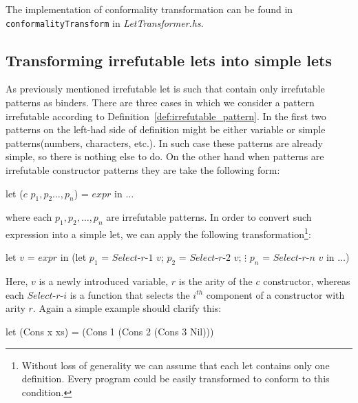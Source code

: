 \documentclass[12pt,a4paper]{report}
\begin{document}
The implementation of conformality transformation can be found in
\texttt{conformalityTransform} in \textit{LetTransformer.hs}.

\subsection{Transforming irrefutable lets into simple lets}
As previously mentioned irrefutable let is such that contain only
irrefutable patterns as binders. There are three cases in which we consider a
pattern irrefutable according to Definition~\ref{def:irrefutable_pattern}. In
the first two patterns on the left-had side of definition might be either
variable or simple patterns(numbers, characters, etc.). In such case these
patterns are already simple, so there is nothing else to do. On the other hand
when patterns are irrefutable constructor patterns they are take the following
form:

\vspace*{0.2in}
\begin{code}[style=haskell,mathescape=true]
  let ($c$ $p_1, p_2 \ldots, p_n$) = $expr$ in $\ldots$
\end{code}

where each $p_1, p_2, \ldots, p_n$ are irrefutable patterns. In order to
convert such expression into a simple let, we can apply the following
transformation\footnote{Without loss of generality we can assume that each
let contains only one definition. Every program could be easily
transformed to conform to this condition.}:

\vspace*{0.2in}
\begin{code}[style=haskell,mathescape=true]
let $v$ = $expr$
in (let $p_1$ = $Select\mbox{-}r\mbox{-}1$ $v$;
        $p_2$ = $Select\mbox{-}r\mbox{-}2$ $v$;
              $\vdots$
        $p_n$ = $Select\mbox{-}r\mbox{-}n$ $v$
    in $\ldots$)
\end{code}

Here, $v$ is a newly introduced variable, $r$ is the arity of the $c$
constructor, whereas each $Select\mbox{-}r\mbox{-}i$ is a function that selects
the $i^{th}$ component of a constructor with arity $r$. Again a simple example
should clarify this:

\vspace*{0.2in}
\begin{code}[style=haskell,mathescape=true]
let (Cons x xs) = (Cons 1 (Cons 2 (Cons 3 Nil)))
\end{code}
\end{document}
